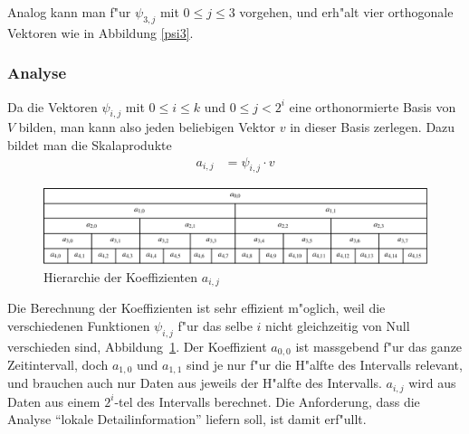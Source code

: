 Analog kann man f"ur $\psi_{3,j}$ mit $0\le j\le 3$ vorgehen, und
erh"alt vier orthogonale Vektoren wie in Abbildung \ref{psi3}.

\subsubsection{Analyse}
Da die Vektoren $\psi_{i,j}$ mit $0\le i\le k$ und
$0\le j< 2^i$ eine orthonormierte Basis von $V$ bilden, man kann also
jeden beliebigen Vektor $v$ in dieser Basis zerlegen.
Dazu bildet man die Skalaprodukte
\begin{align*}
a_{i,j}&=\psi_{i,j}\cdot v
\end{align*}
\begin{figure}
\begin{center}
\includegraphics[width=\hsize]{images/signal-4}
\end{center}
\caption{Hierarchie der Koeffizienten $a_{i,j}$\label{coefhierarchy}}
\end{figure}
Die Berechnung der Koeffizienten ist sehr effizient m"oglich, weil die
verschiedenen Funktionen $\psi_{i,j}$ f"ur das selbe $i$ nicht gleichzeitig
von Null verschieden sind, Abbildung~\ref{coefhierarchy}.
Der Koeffizient $a_{0,0}$ ist massgebend f"ur das ganze Zeitintervall,
doch $a_{1,0}$ und $a_{1,1}$ sind je nur f"ur die H"alfte des Intervalls
relevant, und brauchen auch nur Daten aus jeweils der H"alfte
des Intervalls. $a_{i,j}$ wird aus Daten aus einem $2^i$-tel des
Intervalls berechnet.
Die Anforderung, dass die Analyse ``lokale Detailinformation''
liefern soll, ist damit erf"ullt.

